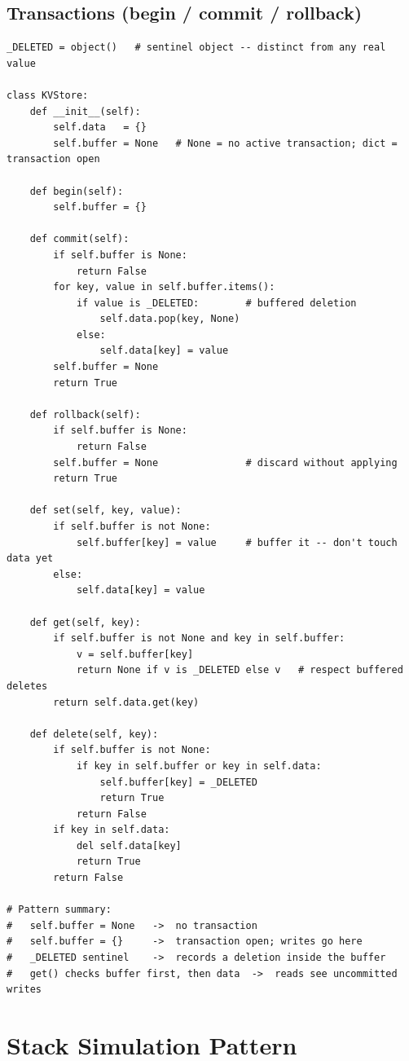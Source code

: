 \documentclass[10pt,letterpaper]{article}
\begin{document}
\subsection{Transactions (begin / commit / rollback)}
\begin{lstlisting}
_DELETED = object()   # sentinel object -- distinct from any real value

class KVStore:
    def __init__(self):
        self.data   = {}
        self.buffer = None   # None = no active transaction; dict = transaction open

    def begin(self):
        self.buffer = {}

    def commit(self):
        if self.buffer is None:
            return False
        for key, value in self.buffer.items():
            if value is _DELETED:        # buffered deletion
                self.data.pop(key, None)
            else:
                self.data[key] = value
        self.buffer = None
        return True

    def rollback(self):
        if self.buffer is None:
            return False
        self.buffer = None               # discard without applying
        return True

    def set(self, key, value):
        if self.buffer is not None:
            self.buffer[key] = value     # buffer it -- don't touch data yet
        else:
            self.data[key] = value

    def get(self, key):
        if self.buffer is not None and key in self.buffer:
            v = self.buffer[key]
            return None if v is _DELETED else v   # respect buffered deletes
        return self.data.get(key)

    def delete(self, key):
        if self.buffer is not None:
            if key in self.buffer or key in self.data:
                self.buffer[key] = _DELETED
                return True
            return False
        if key in self.data:
            del self.data[key]
            return True
        return False

# Pattern summary:
#   self.buffer = None   ->  no transaction
#   self.buffer = {}     ->  transaction open; writes go here
#   _DELETED sentinel    ->  records a deletion inside the buffer
#   get() checks buffer first, then data  ->  reads see uncommitted writes
\end{lstlisting}

\section{Stack Simulation Pattern}
\end{document}
